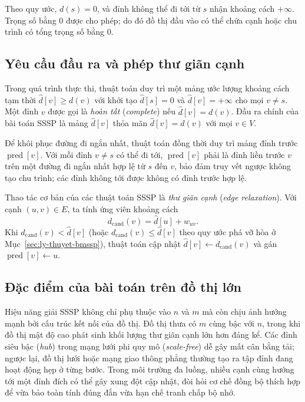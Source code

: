 Theo quy ước, $d(s)=0$, và đỉnh không thể đi tới từ $s$ nhận khoảng cách $+\infty$. Trọng số bằng $0$ được cho phép; do đó đồ thị đầu vào có thể chứa cạnh hoặc chu trình có tổng trọng số bằng $0$.

\subsection{Yêu cầu đầu ra và phép thư giãn cạnh}

Trong quá trình thực thi, thuật toán duy trì một mảng ước lượng khoảng cách tạm thời $\widehat{d}[v] \ge d(v)$ với khởi tạo $\widehat{d}[s] = 0$ và $\widehat{d}[v] = +\infty$ cho mọi $v \neq s$. Một đỉnh $v$ được gọi là \textit{hoàn tất} (\textit{complete}) nếu $\widehat{d}[v] = d(v)$. Đầu ra chính của bài toán SSSP là mảng $\widehat{d}[v]$ thỏa mãn $\widehat{d}[v] = d(v)$ với mọi $v\in V$.

Để khôi phục đường đi ngắn nhất, thuật toán đồng thời duy trì mảng đỉnh trước $\operatorname{pred}[v]$. Với mỗi đỉnh $v\neq s$ có thể đi tới, $\operatorname{pred}[v]$ phải là đỉnh liền trước $v$ trên một đường đi ngắn nhất hợp lệ từ $s$ đến $v$, bảo đảm truy vết ngược không tạo chu trình; các đỉnh không tới được không có đỉnh trước hợp lệ.

Thao tác cơ bản của các thuật toán SSSP là \textit{thư giãn cạnh} (\textit{edge relaxation})\cite{cormen2022introduction}. Với cạnh $(u,v)\in E$, ta tính ứng viên khoảng cách
\begin{equation}
    d_{\mathrm{cand}}(v) = \widehat{d}[u] + w_{uv}.
    \label{eq:ung-vien-thu-gian}
\end{equation}
Khi $d_{\mathrm{cand}}(v) < \widehat{d}[v]$ (hoặc $d_{\mathrm{cand}}(v) \le \widehat{d}[v]$ theo quy ước phá vỡ hòa ở Mục~\ref{sec:ly-thuyet-bmssp}), thuật toán cập nhật $\widehat{d}[v] \leftarrow d_{\mathrm{cand}}(v)$ và gán $\operatorname{pred}[v] \leftarrow u$.

\subsection{Đặc điểm của bài toán trên đồ thị lớn}

Hiệu năng giải SSSP không chỉ phụ thuộc vào $n$ và $m$ mà còn chịu ảnh hưởng mạnh bởi cấu trúc kết nối của đồ thị. Đồ thị thưa có $m$ cùng bậc với $n$, trong khi đồ thị mật độ cao phát sinh khối lượng thư giãn cạnh lớn hơn đáng kể. Các đỉnh siêu bậc (\textit{hub}) trong mạng lưới phi quy mô (\textit{scale-free}) dễ gây mất cân bằng tải; ngược lại, đồ thị lưới hoặc mạng giao thông phẳng thường tạo ra tập đỉnh đang hoạt động hẹp ở từng bước. Trong môi trường đa luồng, nhiều cạnh cùng hướng tới một đỉnh đích có thể gây xung đột cập nhật, đòi hỏi cơ chế đồng bộ thích hợp để vừa bảo toàn tính đúng đắn vừa hạn chế tranh chấp bộ nhớ.

